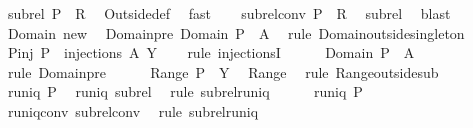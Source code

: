 \begin{isabellebody}
\ subrel{\isacharcolon}\ {\isachardoublequoteopen}{\isacharquery}P\ {\isasymsubseteq}\ R{\isachardoublequoteclose}\ \isamarkupfalse%
\ Outside{\isacharunderscore}def\ \isamarkupfalse%
\ fast\isanewline
\ \ \isamarkupfalse%
\ subrel{\isacharunderscore}conv{\isacharcolon}\ {\isachardoublequoteopen}{\isacharquery}P{\isasyminverse}\ {\isasymsubseteq}\ R{\isasyminverse}{\isachardoublequoteclose}\ \isamarkupfalse%
\ subrel\ \isamarkupfalse%
\ blast\isanewline
\isanewline
\ \ \isanewline
\ \ \isamarkupfalse%
\ Domain\ new\ \isamarkupfalse%
\ Domain{\isacharunderscore}pre{\isacharcolon}\ {\isachardoublequoteopen}Domain\ {\isacharquery}P\ {\isacharequal}\ A{\isachardoublequoteclose}\ \isamarkupfalse%
\ {\isacharparenleft}rule\ Domain{\isacharunderscore}outside{\isacharunderscore}singleton{\isacharparenright}\isanewline
\ \ \isamarkupfalse%
\ P{\isacharunderscore}inj{\isacharcolon}\ {\isachardoublequoteopen}{\isacharquery}P\ {\isasymin}\ injections\ A\ Y{\isachardoublequoteclose}\isanewline
\ \ \isamarkupfalse%
\ {\isacharparenleft}rule\ injectionsI{\isacharparenright}\isanewline
\ \ \ \ \isamarkupfalse%
\ {\isachardoublequoteopen}Domain\ {\isacharquery}P\ {\isacharequal}\ A{\isachardoublequoteclose}\ \isamarkupfalse%
\ {\isacharparenleft}rule\ Domain{\isacharunderscore}pre{\isacharparenright}\isanewline
\ \ \ \ \isamarkupfalse%
\ {\isachardoublequoteopen}Range\ {\isacharquery}P\ {\isasymsubseteq}\ Y{\isachardoublequoteclose}\ \isamarkupfalse%
\ Range\ \isamarkupfalse%
\ {\isacharparenleft}rule\ Range{\isacharunderscore}outside{\isacharunderscore}sub{\isacharparenright}\isanewline
\ \ \ \ \isamarkupfalse%
\ {\isachardoublequoteopen}runiq\ {\isacharquery}P{\isachardoublequoteclose}\ \isamarkupfalse%
\ runiq\ subrel\ \isamarkupfalse%
\ {\isacharparenleft}rule\ subrel{\isacharunderscore}runiq{\isacharparenright}\isanewline
\ \ \ \ \isamarkupfalse%
\ {\isachardoublequoteopen}runiq\ {\isacharparenleft}{\isacharquery}P{\isasyminverse}{\isacharparenright}{\isachardoublequoteclose}\ \isamarkupfalse%
\ runiq{\isacharunderscore}conv\ subrel{\isacharunderscore}conv\ \isamarkupfalse%
\ {\isacharparenleft}rule\ subrel{\isacharunderscore}runiq{\isacharparenright}\isanewline
\ \ \isamarkupfalse%
\isanewline
\isanewline

\end{isabellebody}

